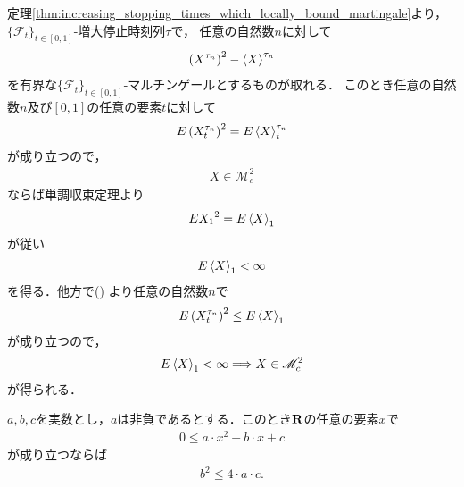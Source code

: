 	\begin{sketch}
		定理\ref{thm:increasing_stopping_times_which_locally_bound_martingale}より，
		$\{\mathscr{F}_{t}\}_{t \in [0,1]}$-増大停止時刻列$\tau$で，
		任意の自然数$n$に対して
		\begin{align}
			\left(X^{\tau_{n}}\right)^{2} - \inprod<X>^{\tau_{n}}
		\end{align}
		を有界な$\{\mathscr{F}_{t}\}_{t \in [0,1]}$-マルチンゲールとするものが取れる．
		このとき任意の自然数$n$及び$[0,1]$の任意の要素$t$に対して
		\begin{align}
			E\left(X^{\tau_{n}}_{t}\right)^{2} = E\inprod<X>^{\tau_{n}}_{t}
			\label{fom:square_integrable_iff_quadratic_variation_integrable}
		\end{align}
		が成り立つので，
		\begin{align}
			X \in \mathscr{M}_{c}^{2}
		\end{align}
		ならば単調収束定理より
		\begin{align}
			E{X_{1}}^{2} = E\inprod<X>_{1}
		\end{align}
		が従い
		\begin{align}
			E\inprod<X>_{1} < \infty
		\end{align}
		を得る．他方で()
		より任意の自然数$n$で
		\begin{align}
			E\left(X^{\tau_{n}}_{t}\right)^{2} \leq E\inprod<X>_{1}
		\end{align}
		が成り立つので，
		\begin{align}
			E\inprod<X>_{1} < \infty \Longrightarrow X \in \mathscr{M}_{c}^{2}
		\end{align}
		が得られる．
		\QED
	\end{sketch}
	
	\begin{screen}
		\begin{thm}[二次関数が非負であるための条件]
		\label{thm:nonnegative_condition_of_quadratic_function}
			$a,b,c$を実数とし，$a$は非負であるとする．このとき$\mathbf{R}$の任意の要素$x$で
			\begin{align}
				0 \leq a \cdot x^{2} + b \cdot x + c
				\label{fom:nonnegative_condition_of_quadratic_function}
			\end{align}
			が成り立つならば
			\begin{align}
				b^{2} \leq 4 \cdot a \cdot c.
			\end{align}
		\end{thm}
	\end{screen}
	
